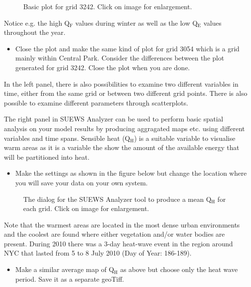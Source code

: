 \documentclass[letterpaper,10pt,english]{sphinxmanual}
\begin{document}
\begin{figure}[htbp]
\centering
\capstart

\noindent{}
\caption{Basic plot for grid 3242. Click on image for enlargement.}\label{\detokenize{Tutorials/SuewsSpatial:id15}}\end{figure}

Notice e.g. the high Q$_{\text{F}}$ values during winter as well as the low Q$_{\text{E}}$ values throughout the year.
\begin{itemize}
\item {} 
Close the plot and make the same kind of plot for grid 3054 which is a grid mainly within Central Park. Consider the differences between the plot generated for grid 3242. Close the plot when you are done.

\end{itemize}

In the left panel, there is also possibilities to examine two different variables in time, either from the same grid or between two different grid points. There is also possible to examine different parameters through scatterplots.

The right panel in SUEWS Analyzer can be used to perform basic spatial analysis on your model results by producing aggragated maps etc. using different variables and time spans. Sensible heat (Q$_{\text{H}}$) is a suitable variable to visualise warm areas as it is a variable the show the amount of the available energy that will be partitioned into heat.
\begin{itemize}
\item {} 
Make the settings as shown in the figure below but change the location where you will save your data on your own system.

\end{itemize}

\begin{figure}[htbp]
\centering
\capstart

\noindent{}
\caption{The dialog for the SUEWS Analyzer tool to produce a mean Q$_{\text{H}}$ for each grid. Click on image for enlargement.}\label{\detokenize{Tutorials/SuewsSpatial:id16}}\end{figure}

Note that the warmest areas are located in the most dense urban environments and the coolest are found where either vegetation and/or water bodies are present. During 2010 there was a 3-day heat-wave event in the region around NYC that lasted from 5 to 8 July 2010 (Day of Year: 186-189).
\begin{itemize}
\item {} 
Make a similar average map of Q$_{\text{H}}$ as above but choose only the heat wave period. Save it as a separate geoTiff.

\end{itemize}
\end{document}
